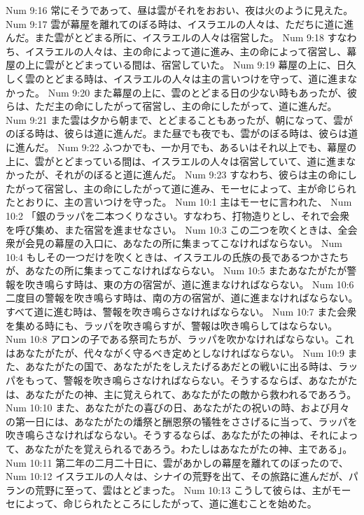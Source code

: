 Num 9:16  常にそうであって、昼は雲がそれをおおい、夜は火のように見えた。
Num 9:17  雲が幕屋を離れてのぼる時は、イスラエルの人々は、ただちに道に進んだ。また雲がとどまる所に、イスラエルの人々は宿営した。
Num 9:18  すなわち、イスラエルの人々は、主の命によって道に進み、主の命によって宿営し、幕屋の上に雲がとどまっている間は、宿営していた。
Num 9:19  幕屋の上に、日久しく雲のとどまる時は、イスラエルの人々は主の言いつけを守って、道に進まなかった。
Num 9:20  また幕屋の上に、雲のとどまる日の少ない時もあったが、彼らは、ただ主の命にしたがって宿営し、主の命にしたがって、道に進んだ。
Num 9:21  また雲は夕から朝まで、とどまることもあったが、朝になって、雲がのぼる時は、彼らは道に進んだ。また昼でも夜でも、雲がのぼる時は、彼らは道に進んだ。
Num 9:22  ふつかでも、一か月でも、あるいはそれ以上でも、幕屋の上に、雲がとどまっている間は、イスラエルの人々は宿営していて、道に進まなかったが、それがのぼると道に進んだ。
Num 9:23  すなわち、彼らは主の命にしたがって宿営し、主の命にしたがって道に進み、モーセによって、主が命じられたとおりに、主の言いつけを守った。
Num 10:1  主はモーセに言われた、
Num 10:2  「銀のラッパを二本つくりなさい。すなわち、打物造りとし、それで会衆を呼び集め、また宿営を進ませなさい。
Num 10:3  この二つを吹くときは、全会衆が会見の幕屋の入口に、あなたの所に集まってこなければならない。
Num 10:4  もしその一つだけを吹くときは、イスラエルの氏族の長であるつかさたちが、あなたの所に集まってこなければならない。
Num 10:5  またあなたがたが警報を吹き鳴らす時は、東の方の宿営が、道に進まなければならない。
Num 10:6  二度目の警報を吹き鳴らす時は、南の方の宿営が、道に進まなければならない。すべて道に進む時は、警報を吹き鳴らさなければならない。
Num 10:7  また会衆を集める時にも、ラッパを吹き鳴らすが、警報は吹き鳴らしてはならない。
Num 10:8  アロンの子である祭司たちが、ラッパを吹かなければならない。これはあなたがたが、代々ながく守るべき定めとしなければならない。
Num 10:9  また、あなたがたの国で、あなたがたをしえたげるあだとの戦いに出る時は、ラッパをもって、警報を吹き鳴らさなければならない。そうするならば、あなたがたは、あなたがたの神、主に覚えられて、あなたがたの敵から救われるであろう。
Num 10:10  また、あなたがたの喜びの日、あなたがたの祝いの時、および月々の第一日には、あなたがたの燔祭と酬恩祭の犠牲をささげるに当って、ラッパを吹き鳴らさなければならない。そうするならば、あなたがたの神は、それによって、あなたがたを覚えられるであろう。わたしはあなたがたの神、主である」。
Num 10:11  第二年の二月二十日に、雲があかしの幕屋を離れてのぼったので、
Num 10:12  イスラエルの人々は、シナイの荒野を出て、その旅路に進んだが、パランの荒野に至って、雲はとどまった。
Num 10:13  こうして彼らは、主がモーセによって、命じられたところにしたがって、道に進むことを始めた。
